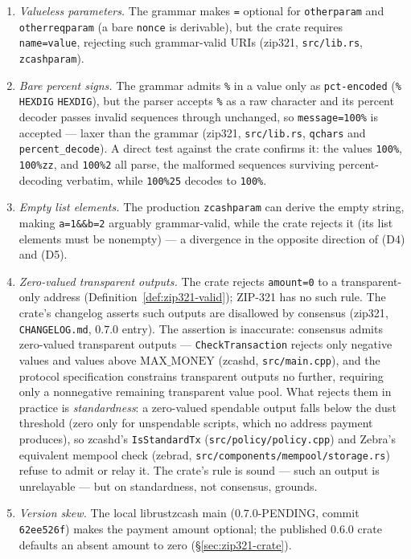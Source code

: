 \documentclass[11pt,a4paper]{article}
\theoremstyle{definition}
\begin{document}
\begin{enumerate}[label=(D\arabic*)]
  the ABNF case-insensitivity as a defect of the ZIP text: an uppercased
  URI is unparseable to the deployed stack, so a producer wanting QR
  alphanumeric mode must not obtain it by uppercasing the URI.
\item \emph{Valueless parameters.} The grammar makes \texttt{=} optional
  for \texttt{otherparam} and \texttt{otherreqparam} (a bare \texttt{nonce}
  is derivable), but the crate requires \texttt{name=value}, rejecting such
  grammar-valid URIs (\textsf{zip321}, \texttt{src/lib.rs},
  \texttt{zcashparam}).
\item \emph{Bare percent signs.} The grammar admits \texttt{\%} in a value
  only as \texttt{pct-encoded} (\texttt{\%} \texttt{HEXDIG} \texttt{HEXDIG}),
  but the parser accepts \texttt{\%} as a raw character and its percent
  decoder passes invalid sequences through unchanged, so
  \texttt{message=100\%} is accepted --- laxer than the grammar
  (\textsf{zip321}, \texttt{src/lib.rs}, \texttt{qchars} and
  \texttt{percent\_decode}). A direct test against the crate confirms
  it: the values \texttt{100\%}, \texttt{100\%zz}, and \texttt{100\%2}
  all parse, the malformed sequences surviving percent-decoding
  verbatim, while \texttt{100\%25} decodes to \texttt{100\%}.
\item \emph{Empty list elements.} The production \texttt{zcashparam} can
  derive the empty string, making \texttt{a=1\&\&b=2} arguably
  grammar-valid, while the crate rejects it (its list elements must be
  nonempty) --- a divergence in the opposite direction of (D4) and (D5).
\item \emph{Zero-valued transparent outputs.} The crate rejects
  \texttt{amount=0} to a transparent-only address
  (Definition~\ref{def:zip321-valid}); ZIP-321 has no such rule. The crate's
  changelog asserts such outputs are disallowed by consensus
  (\textsf{zip321}, \texttt{CHANGELOG.md}, $0.7.0$ entry).
  The assertion is inaccurate: consensus admits zero-valued transparent
  outputs --- \texttt{CheckTransaction} rejects only negative values and
  values above $\mathrm{MAX\_MONEY}$ (\textsf{zcashd},
  \texttt{src/main.cpp}), and the protocol specification constrains
  transparent outputs no further, requiring only a nonnegative remaining
  transparent value pool. What rejects them in practice is
  \emph{standardness}: a zero-valued spendable output falls below the
  dust threshold (zero only for unspendable scripts, which no address
  payment produces), so \textsf{zcashd}'s \texttt{IsStandardTx}
  (\texttt{src/policy/policy.cpp}) and Zebra's equivalent mempool check
  (\textsf{zebrad}, \texttt{src/components/mempool/storage.rs}) refuse
  to admit or relay it. The crate's rule is sound --- such an output is
  unrelayable --- but on standardness, not consensus, grounds.
\item \emph{Version skew.} The local librustzcash main ($0.7.0$-PENDING,
  commit \texttt{62ee526f}) makes the payment amount optional; the published
  $0.6.0$ crate defaults an absent amount to zero
  (\S\ref{sec:zip321-crate}).
\end{enumerate}
\end{document}
